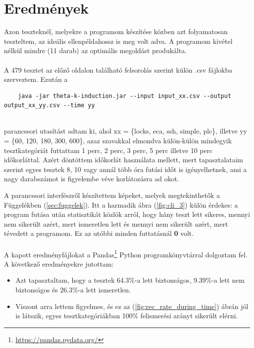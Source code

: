 \section{Eredmények}
\label{sec:kiertekeles_ered}

Azon teszteknél, melyekre a programom készítése közben azt folyamatosan teszteltem, az ideális ellenpéldahossz is meg volt adva. A programom kivétel nélkül mindre (11 darab) az optimális megoldást produkálta. 
\\
\\
A 479 tesztet az előző oldalon található felsorolás szerint külön .csv fájlokba szerveztem. Ezután a 
\ \\
\begin{lstlisting}
	java -jar theta-k-induction.jar --input input_xx.csv --output output_xx_yy.csv --time yy
\end{lstlisting}
\ \\
parancssori utasítást adtam ki, ahol xx = \{locks, eca, ssh, simple, plc\}, illetve yy = \{60, 120, 180, 300, 600\}, azaz szavakkal elmondva külön-külön mindegyik tesztkategóriát futtattam 1 perc, 2 perc, 3 perc, 5 perc illetve 10 perc időkorláttal. Azért döntöttem időkorlát használata mellett, mert tapasztalataim szerint egyes tesztek 8, 10 vagy annál több óra futási időt is igényelhetnek, ami a nagy darabszámot is figyelembe véve korlátozásra ad okot. 

A parancssori interfészről készítettem képeket, melyek megtekinthetők a Függelékben (\ref{sec:fuggelek}). Itt a harmadik ábra (\ref{fig:cli_3}) külön érdekes: a program futása után statisztikát közlök arról, hogy hány teszt lett sikeres, mennyi nem sikerült azért, mert ismeretlen lett és mennyi nem sikerült azért, mert tévedett a programom. Ez az utóbbi minden futtatásnál \textbf{0} volt.
\\
\\
A kapott eredményfájlokat a Pandas\footnote{\url{https://pandas.pydata.org/}} Python programkönyvtárral dolgoztam fel. A következő eredményekre jutottam:

\begin{itemize}
	\item Azt tapasztaltam, hogy a tesztek 64.3\%-a lett biztonságos, 9.39\%-a lett nem biztonságos és 26.3\%-a lett ismeretlen.
	\item Viszont arra lettem figyelmes, és ez az (\ref{fig:rec_rate_during_time}) ábrán jól is látszik, egyes tesztkategóriákban 100\% felismerési arányt sikerült elérni.
\end{itemize}

